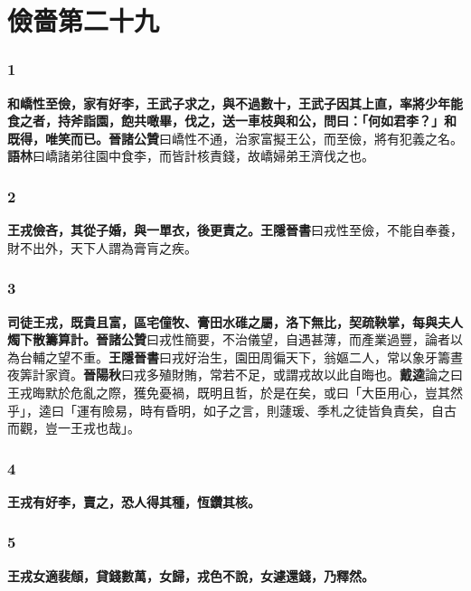 \chapter{儉嗇第二十九}

\subsection*{1}

\textbf{和嶠性至儉，家有好李，王武子求之，與不過數十，王武子因其上直，率將少年能食之者，持斧詣園，飽共噉畢，伐之，送一車枝與和公，問曰：「何如君李？」和既得，唯笑而已。}{\footnotesize \textbf{晉諸公贊}曰嶠性不通，治家富擬王公，而至儉，將有犯義之名。\textbf{語林}曰嶠諸弟往園中食李，而皆計核責錢，故嶠婦弟王濟伐之也。}

\subsection*{2}

\textbf{王戎儉吝，其從子婚，與一單衣，後更責之。}{\footnotesize \textbf{王隱晉書}曰戎性至儉，不能自奉養，財不出外，天下人謂為膏肓之疾。}

\subsection*{3}

\textbf{司徒王戎，既貴且富，區宅僮牧、膏田水碓之屬，洛下無比，契疏鞅掌，每與夫人燭下散籌算計。}{\footnotesize \textbf{晉諸公贊}曰戎性簡要，不治儀望，自遇甚薄，而產業過豐，論者以為台輔之望不重。\textbf{王隱晉書}曰戎好治生，園田周徧天下，翁嫗二人，常以象牙籌晝夜筭計家資。\textbf{晉陽秋}曰戎多殖財賄，常若不足，或謂戎故以此自晦也。\textbf{戴逵}論之曰王戎晦默於危亂之際，獲免憂禍，既明且哲，於是在矣，或曰「大臣用心，豈其然乎」，逵曰「運有險易，時有昏明，如子之言，則蘧瑗、季札之徒皆負責矣，自古而觀，豈一王戎也哉」。}

\subsection*{4}

\textbf{王戎有好李，賣之，恐人得其種，恆鑽其核。}

\subsection*{5}

\textbf{王戎女適裴頠，貸錢數萬，女歸，戎色不說，女遽還錢，乃釋然。}

